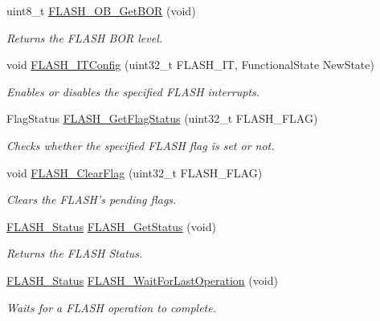 \begin{DoxyCompactItemize}
uint8\-\_\-t \hyperlink{group___f_l_a_s_h_gab8a8804905929b2edd544d28c2e7b215}{F\-L\-A\-S\-H\-\_\-\-O\-B\-\_\-\-Get\-B\-O\-R} (void)
\begin{DoxyCompactList}\small\item\em Returns the F\-L\-A\-S\-H B\-O\-R level. \end{DoxyCompactList}\item 
void \hyperlink{group___f_l_a_s_h_ga94c1e51a9c3bf8d48eb6eb4a4d054861}{F\-L\-A\-S\-H\-\_\-\-I\-T\-Config} (uint32\-\_\-t F\-L\-A\-S\-H\-\_\-\-I\-T, Functional\-State New\-State)
\begin{DoxyCompactList}\small\item\em Enables or disables the specified F\-L\-A\-S\-H interrupts. \end{DoxyCompactList}\item 
Flag\-Status \hyperlink{group___f_l_a_s_h_gae3fb545e32f21501ca27d4380e0f2088}{F\-L\-A\-S\-H\-\_\-\-Get\-Flag\-Status} (uint32\-\_\-t F\-L\-A\-S\-H\-\_\-\-F\-L\-A\-G)
\begin{DoxyCompactList}\small\item\em Checks whether the specified F\-L\-A\-S\-H flag is set or not. \end{DoxyCompactList}\item 
void \hyperlink{group___f_l_a_s_h_gac4be1d486483fa5cd70ec77d44ca8f87}{F\-L\-A\-S\-H\-\_\-\-Clear\-Flag} (uint32\-\_\-t F\-L\-A\-S\-H\-\_\-\-F\-L\-A\-G)
\begin{DoxyCompactList}\small\item\em Clears the F\-L\-A\-S\-H's pending flags. \end{DoxyCompactList}\item 
\hyperlink{group___f_l_a_s_h_gadc63a6f3404ff1f71229a66915e9cdc0}{F\-L\-A\-S\-H\-\_\-\-Status} \hyperlink{group___f_l_a_s_h_gac265b8d1e7ea11e44ceee28797c3debb}{F\-L\-A\-S\-H\-\_\-\-Get\-Status} (void)
\begin{DoxyCompactList}\small\item\em Returns the F\-L\-A\-S\-H Status. \end{DoxyCompactList}\item 
\hyperlink{group___f_l_a_s_h_gadc63a6f3404ff1f71229a66915e9cdc0}{F\-L\-A\-S\-H\-\_\-\-Status} \hyperlink{group___f_l_a_s_h_gaaf8ea3b00c9a5f5eca0df9a795b83f22}{F\-L\-A\-S\-H\-\_\-\-Wait\-For\-Last\-Operation} (void)
\begin{DoxyCompactList}\small\item\em Waits for a F\-L\-A\-S\-H operation to complete. \end{DoxyCompactList}\end{DoxyCompactItemize}


